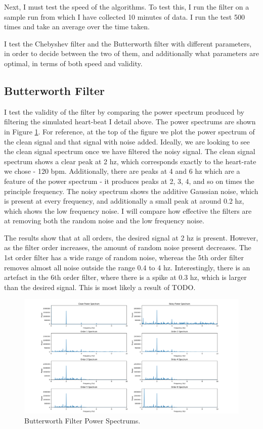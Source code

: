 \documentclass[12pt,a4paper,twoside,openright]{report}
\begin{document}
Next, I must test the speed of the algorithms. To test this, I run the filter
on a sample run from which I have collected 10 minutes of data. I run the test
500 times and take an average over the time taken.

I test the Chebyshev filter and the Butterworth filter with different
parameters, in order to decide between the two of them, and additionally what
parameters are optimal, in terms of both speed and validity.

\subsection{Butterworth Filter}

I test the validity of the filter by comparing the power spectrum produced by
filtering the simulated heart-beat I detail above. The power spectrums are
shown in Figure 
\ref{fig:butterworth-validity}. For reference, at the top of the figure we
plot the power spectrum of the clean signal and that signal with noise added.
Ideally, we are looking to see the clean signal spectrum once we have filtered the
noisy signal. The clean signal spectrum shows a clear peak at 2 hz, which
corresponds exactly to the heart-rate we chose - 120 bpm. Additionally, there
are peaks at 4 and 6 hz which are a feature of the power spectrum - it
produces peaks at 2, 3, 4, and so on times the principle frequency. The noisy
spectrum shows the additive Gaussian noise, which is present at every
frequency, and additionally a small peak at around 0.2 hz, which shows the low
frequency noise. I will compare how effective the filters are at removing both
the random noise and the low frequency noise.

The results show that at all orders, the desired signal at 2 hz is present.
However, as the filter order increases, the amount of random noise present
decreases. The 1st order filter has a wide range of random noise, whereas the
5th order filter removes almost all noise outside the range 0.4 to 4 hz.
Interestingly, there is an artefact in the 6th order filter, where there is a
spike at 0.3 hz, which is larger than the desired signal. This is most likely
a result of TODO.

\begin{figure}
	\centering
	\includegraphics[width=\textwidth]{figs/butterworth-validity.png}
	\caption{Butterworth Filter Power Spectrums.}
	\label{fig:butterworth-validity}
\end{figure}
\end{document}
